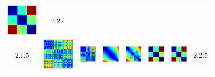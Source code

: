 \documentclass[bachelor, nocolorlinks, printoneside]{seuthesis} %
\begin{document}
\begin{Main}
\begin{figure}[ht!]
\begin{centering}
\begin{tabular}{cccc|cccc}
        \includegraphics[width=0.12\columnwidth,keepaspectratio]{figs/toy_triangle/cluster_converge_3by16_4_3.png} & 2.2.4\\
        2.1.5 &\includegraphics[width=0.12\columnwidth,keepaspectratio]{figs/toy_triangle/cluster_converge_3by30_5_1.png} &
        \includegraphics[width=0.12\columnwidth,keepaspectratio]{figs/toy_triangle/cluster_converge_3by30_5_2.png} &
        \includegraphics[width=0.12\columnwidth,keepaspectratio]{figs/toy_triangle/cluster_converge_3by30_5_3.png} &  
        \includegraphics[width=0.12\columnwidth,keepaspectratio]{figs/toy_triangle/cluster_converge_3by16_5_1.png} &
        \includegraphics[width=0.12\columnwidth,keepaspectratio]{figs/toy_triangle/cluster_converge_3by16_5_2.png} &
        \includegraphics[width=0.12\columnwidth,keepaspectratio]{figs/toy_triangle/cluster_converge_3by16_5_3.png}& 2.2.5\\

\end{tabular}
\end{centering}
\end{figure}
\end{Main}
\end{document}
